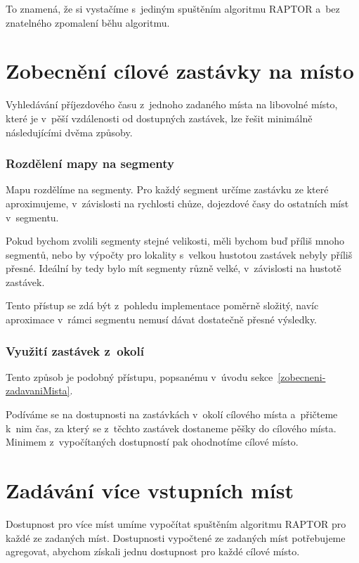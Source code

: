 To znamená, že si vystačíme s~jediným spuštěním algoritmu RAPTOR a~bez znatelného zpomalení běhu algoritmu.


\section{Zobecnění cílové zastávky na místo}\label{zobecneni-ciloveZastavkyNaMista}

Vyhledávání příjezdového času z~jednoho zadaného místa na libovolné místo, které je v~pěší vzdálenosti od dostupných zastávek, lze řešit minimálně následujícími dvěma způsoby.

\subsubsection{Rozdělení mapy na segmenty}

Mapu rozdělíme na segmenty. Pro každý segment určíme zastávku ze které aproximujeme, v~závislosti na rychlosti chůze, dojezdové časy do ostatních míst v~segmentu.

Pokud bychom zvolili segmenty stejné velikosti, měli bychom buď příliš mnoho segmentů, nebo by výpočty pro lokality s~velkou hustotou zastávek nebyly příliš přesné. Ideální by tedy bylo mít segmenty různě velké, v~závislosti na hustotě zastávek.

Tento přístup se zdá být z~pohledu implementace poměrně složitý, navíc aproximace v~rámci segmentu nemusí dávat dostatečně přesné výsledky.

\subsubsection{Využití zastávek z~okolí}

Tento způsob je podobný přístupu, popsanému v~úvodu sekce~\ref{zobecneni-zadavaniMista}. 

Podíváme se na dostupnosti na zastávkách v~okolí cílového místa a~přičteme k~nim čas, za který se z~těchto zastávek dostaneme pěšky do cílového místa. Minimem z~vypočítaných dostupností pak ohodnotíme cílové místo.


\section{Zadávání více vstupních míst}\label{zobecneni-viceVstupnichMist}

Dostupnost pro více míst umíme vypočítat spuštěním algoritmu RAPTOR pro každé ze zadaných míst. Dostupnosti vypočtené ze zadaných míst potřebujeme agregovat, abychom získali jednu dostupnost pro každé cílové místo.

